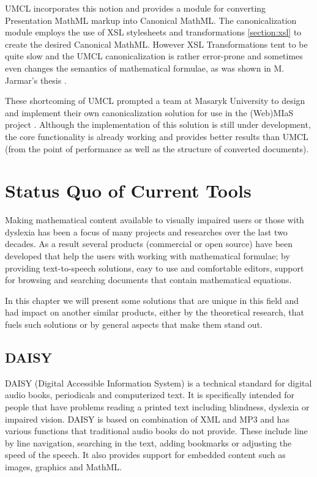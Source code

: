 \documentclass[11pt,oneside,final]{fithesis2}
\begin{document}
UMCL incorporates this notion and provides a module for converting Presentation MathML markup into Canonical MathML. The canonicalization module employs the use of XSL stylesheets and transformations \ref{section:xsl} to create the desired Canonical MathML. However XSL Transformations tent to be quite slow and the UMCL canonicalization is rather error-prone and sometimes even changes the semantics of mathematical formulae, as was shown in M. Jarmar's thesis \cite[chapter 5]{umcl:jarmar2012conversion}. 

These shortcoming of UMCL prompted a team at Masaryk University to design and implement their own canonicalization solution \cite{canonicalization:formaneketal} for use in the (Web)MIaS project \cite{mias:sojka2011indexing}. Although the implementation of this solution is still under development, the core functionality is already working and provides better results than UMCL (from the point of performance as well as the structure of converted documents). 

\chapter{Status Quo of Current Tools}
Making mathematical content available to visually impaired users or those with dyslexia has been a focus of many projects and researches over the last two decades. As a result several products (commercial or open source) have been developed that help the users with working with mathematical formulae; by providing text-to-speech solutions, easy to use and comfortable editors, support for browsing and searching documents that contain mathematical equations.

In this chapter we will present some solutions that are unique in this field and had impact on another similar products, either by the theoretical research, that fuels such solutions or by general aspects that make them stand out. 

\section{DAISY}
DAISY (Digital Accessible Information System) is a technical standard for digital audio books, periodicals and computerized text. It is specifically intended for people that have problems reading a printed text including blindness, dyslexia or impaired vision. DAISY is based on combination of XML and MP3 and has various functions that traditional audio books do not provide. These include line by line navigation, searching in the text, adding bookmarks or adjusting the speed of the speech. It also provides support for embedded content such as images, graphics and MathML. 
\end{document}
